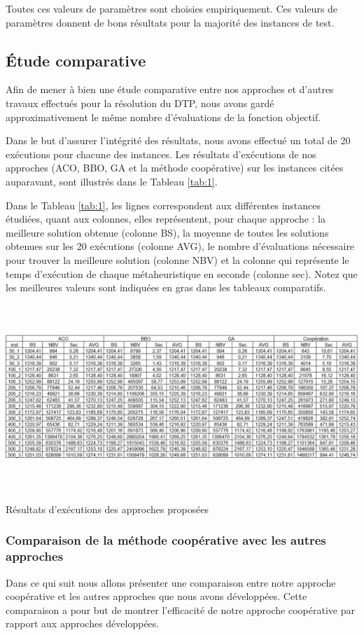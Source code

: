 Toutes ces valeurs de paramètres sont choisies empiriquement. Ces valeurs de paramètres donnent de bons résultats pour la majorité des instances de test.

\subsection{Étude comparative}
Afin de mener à bien une étude comparative entre nos approches et d’autres travaux effectués pour la résolution du DTP, nous avons gardé approximativement le même nombre d’évaluations de la fonction objectif.

Dans le but d’assurer l’intégrité des résultats, nous avons effectué un total de 20 exécutions pour chacune des instances. Les résultats d’exécutions de nos approches (ACO, BBO, GA et la méthode coopérative) sur les instances citées auparavant, sont illustrés dans le Tableau \ref{tab:1}.

Dans le Tableau  \ref{tab:1}, les lignes correspondent aux différentes instances étudiées, quant aux colonnes, elles représentent, pour chaque approche : la meilleure solution obtenue (colonne BS), la moyenne de toutes les solutions obtenues sur les 20 exécutions (colonne AVG), le nombre d’évaluations nécessaire pour trouver la meilleure solution (colonne NBV) et la colonne qui représente le temps d’exécution de chaque métaheuristique en seconde (colonne sec). 
Notez que les meilleures valeurs sont indiquées en gras dans les tableaux comparatifs.


\begin{table}[H]
	\includegraphics[width=17cm,height=7cm]{Chap5/t1.png}
	\caption{Résultats d’exécutions des  approches proposées}
	\label{tab:1}
\end{table}


\subsubsection{Comparaison de la méthode coopérative avec les autres approches}
Dans ce qui suit nous allons présenter une comparaison entre notre approche coopérative et les autres approches que nous avons développées. Cette comparaison a pour but de montrer l’efficacité de notre approche coopérative par rapport aux approches développées. 

